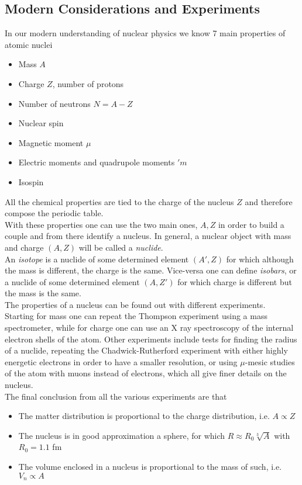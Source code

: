 \documentclass[../qm.tex]{subfiles}
\begin{document}
\subsection{Modern Considerations and Experiments}
In our modern understanding of nuclear physics we know 7 main properties of atomic nuclei
\begin{itemize}
\item Mass $A$
\item Charge $Z$, number of protons
\item Number of neutrons $N=A-Z$
\item Nuclear spin
\item Magnetic moment $\mu$
\item Electric moments and quadrupole moments $'m$
\item Isospin
\end{itemize}
All the chemical properties are tied to the charge of the nucleus $Z$ and therefore compose the periodic table.\\
With these properties one can use the two main ones, $A,Z$ in order to build a couple and from there identify a nucleus. In general, a nuclear object with mass and charge $(A,Z)$ will be called a \emph{nuclide}.\\
An \emph{isotope} is a nuclide of some determined element $(A',Z)$ for which although the mass is different, the charge is the same. Vice-versa one can define \emph{isobars}, or a nuclide of some determined element $(A,Z')$ for which charge is different but the mass is the same.\\
The properties of a nucleus can be found out with different experiments.\\
Starting for mass one can repeat the Thompson experiment using a mass spectrometer, while for charge one can use an X ray spectroscopy of the internal electron shells of the atom. Other experiments include tests for finding the radius of a nuclide, repeating the Chadwick-Rutherford experiment with either highly energetic electrons in order to have a smaller resolution, or using $\mu$-mesic studies of the atom with muons instead of electrons, which all give finer details on the nucleus.\\
The final conclusion from all the various experiments are that
\begin{itemize}
\item The matter distribution is proportional to the charge distribution, i.e. $A\propto Z$
\item The nucleus is in good approximation a sphere, for which $R\approx R_0\sqrt[3]{A}$ with $R_0=1.1$ fm
\item The volume enclosed in a nucleus is proportional to the mass of such, i.e. $V_n\propto A$
\end{itemize}
\end{document}
